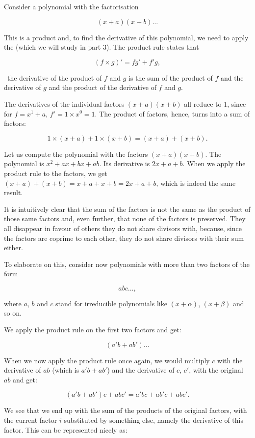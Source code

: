 \documentclass[tikz]{scrreprt}
\begin{document}
Consider a polynomial with the factorisation

\[
(x+a)(x+b)\dots
\]

This is a product and, to find the derivative
of this polynomial, we need to apply the 
(which we will study in part 3). The product rule states that

\begin{equation}
(f \times g)' = fg' + f'g,
\end{equation}

\ie\ the derivative of the product of $f$ and $g$
is the sum of the product of $f$ and the derivative of $g$
and the product of the derivative of $f$ and $g$.

The derivatives of the individual factors $(x+a)(x+b)$
all reduce to 1, since for $f = x^1 + a$,
$f' = 1\times x^0 = 1$. The product of factors, hence,
turns into a sum of factors:

\[
1\times(x+a) + 1\times(x+b) = (x+a) + (x+b).
\]

Let us compute the polynomial
with the factors $(x+a)(x+b)$. The polynomial is
$x^2 + ax + bx + ab$. Its derivative is
$2x + a + b$. When we apply the product rule to
the factors, we get $(x+a)+(x+b)= x+a+x+b = 2x+a+b$,
which is indeed the same result.

It is intuitively clear that the sum of the factors
is not the same as the product of those same factors
and, even further, that none of the factors is preserved.
They all disappear in favour of others they do not
share divisors with, because, since the factors are
coprime to each other, they do not share divisors
with their sum either.

To elaborate on this, consider now polynomials
with more than two factors of the form

\[
abc\dots,
\]

where $a$, $b$ and $c$ stand for irreducible polynomials like
$(x+\alpha)$, $(x+\beta)$ and so on.

We apply the product rule on the first two factors
and get:

\[
(a'b + ab')\dots
\]

When we now apply the product rule once again,
we would multiply $c$ with the derivative of $ab$
(which is $a'b + ab'$) and the derivative of $c$,
$c'$, with the original $ab$ and get:

\[
(a'b + ab')c + abc' = a'bc + ab'c + abc'.
\]

We see that we end up with the sum of the products
of the original factors, with the current factor $i$
substituted by something else, namely the derivative
of this factor. This can be represented nicely as:
\end{document}
